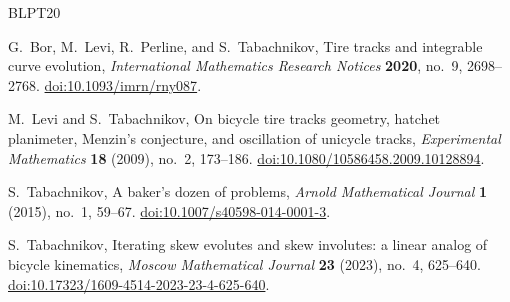 \documentclass[11pt]{article}
\numberwithin{equation}{section}
\begin{document}
\begin{thebibliography}{BLPT20}
\raggedright

G.~Bor, M.~Levi, R.~Perline, and S.~Tabachnikov,
\newblock Tire tracks and integrable curve evolution,
\newblock \emph{International Mathematics Research Notices}
\textbf{2020}, no.~9, 2698--2768.
\newblock \href{https://doi.org/10.1093/imrn/rny087}{doi:10.1093/imrn/rny087}.

M.~Levi and S.~Tabachnikov,
\newblock On bicycle tire tracks geometry, hatchet planimeter, Menzin's
conjecture, and oscillation of unicycle tracks,
\newblock \emph{Experimental Mathematics} \textbf{18} (2009), no.~2,
173--186.
\newblock \href{https://doi.org/10.1080/10586458.2009.10128894}
{doi:10.1080/10586458.2009.10128894}.

S.~Tabachnikov,
\newblock A baker's dozen of problems,
\newblock \emph{Arnold Mathematical Journal} \textbf{1} (2015), no.~1,
59--67.
\newblock \href{https://doi.org/10.1007/s40598-014-0001-3}
{doi:10.1007/s40598-014-0001-3}.

S.~Tabachnikov,
\newblock Iterating skew evolutes and skew involutes: a linear analog of
bicycle kinematics,
\newblock \emph{Moscow Mathematical Journal} \textbf{23} (2023), no.~4,
625--640.
\newblock \href{https://doi.org/10.17323/1609-4514-2023-23-4-625-640}
{\mbox{doi:10.17323/1609-4514-2023-23-4-625-640}}.

\end{thebibliography}
\end{document}
